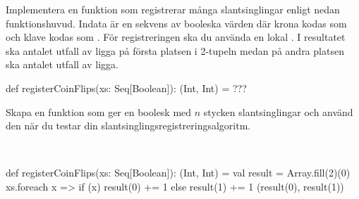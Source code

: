 \QUESTEND





\QUESTBEGIN

\Task \what~\TODO

\SOLUTION

\TaskSolved \what~\TODO

\QUESTEND



\QUESTBEGIN

\Task \what~\TODO

\SOLUTION

\TaskSolved \what~\TODO

\QUESTEND





\ExtraTasks %


\QUESTBEGIN

\Task \what~

\Subtask Implementera en funktion som registrerar många slantsinglingar enligt nedan funktionshuvud. Indata är en sekvens av booleska värden där krona kodas som  och klave kodas som . För registreringen ska du använda en lokal . I resultatet ska antalet utfall av  ligga på första platsen i 2-tupeln medan på andra platsen ska antalet utfall av  ligga.

\begin{Code}
def registerCoinFlips(xs: Seq[Boolean]): (Int, Int) = ???
\end{Code}

\Subtask Skapa en funktion  som ger en boolesk  med $n$ stycken slantsinglingar och använd den när du testar din slantsinglingsregistreringsalgoritm.

\SOLUTION

\TaskSolved \what~

\SubtaskSolved
\begin{Code}
def registerCoinFlips(xs: Seq[Boolean]): (Int, Int) = {
  val result = Array.fill(2)(0)
  xs.foreach{ x =>
    if (x) result(0) += 1 else result(1) += 1
  }
  (result(0), result(1))
}
\end{Code}

\SubtaskSolved



